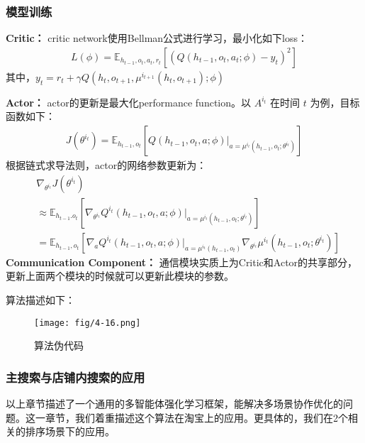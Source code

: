 \subsubsection{模型训练}

\textbf{Critic：} critic network使用Bellman公式进行学习，最小化如下loss：
\begin{align}
L(\phi) = \mathbb{E}_{h_{t-1}, o_t, a_t, r_t}[(Q(h_{t-1}, o_t, a_t; \phi) - y_t)^2]
\end{align}
其中，$y_t = r_t + \gamma Q(h_t, o_{t+1}, \mu^{i_{t+1}}(h_{t}, o_{t+1}); \phi)$

\textbf{Actor：} actor的更新是最大化performance function。以 $A^{i_t}$ 在时间 $t$ 为例，目标函数如下：
\begin{align}
J(\theta^{i_t}) = \mathbb{E}_{h_{t-1}, o_t} [ Q(h_{t-1}, o_t, a; \phi) |_{a = \mu^{i_t}(h_{t-1}, o_t;\theta^{i_t})}]
\end{align}
根据链式求导法则，actor的网络参数更新为：
\begin{equation}
\begin{aligned}& \nabla_{\theta^{i_t}} J(\theta^{i_t}) \\ & \approx \mathbb{E}_{h_{t-1}. o_t}[\nabla_{\theta^{i_t}} Q^{i_t}(h_{t-1}, o_t, a; \phi) |_{a = \mu^{i_t}(h_{t-1}, o_t;\theta^{i_t})}] \\ & = \mathbb{E}_{h_{t-1}, o_t} [\nabla_{a} Q^{i_t}(h_{t-1}, o_t, a; \phi) |_{a=\mu^{i_t}(h_{t-1}, o_t)} \nabla_{\theta^{i_t}} \mu^{i_t}(h_{t-1}, o_t;\theta^{i_t})]
\end{aligned}
\end{equation}
\textbf{Communication Component：} 通信模块实质上为Critic和Actor的共享部分，更新上面两个模块的时候就可以更新此模块的参数。

算法描述如下：
\begin{figure}[!h]
\centering
\texttt{[image: fig/4-16.png]}
\caption{ 算法伪代码}
\end{figure}

\subsubsection{主搜索与店铺内搜索的应用}
以上章节描述了一个通用的多智能体强化学习框架，能解决多场景协作优化的问题。这一章节，我们着重描述这个算法在淘宝上的应用。更具体的，我们在2个相关的排序场景下的应用。

